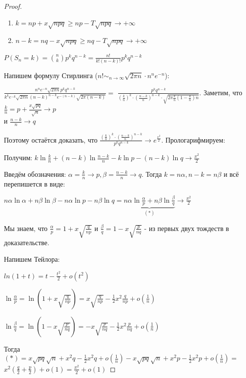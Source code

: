 \begin{proof}
    \hfill \smallbreak
    \begin{enumerate}
        \item {
            $k = np + x\sqrt{npq} \geqslant np - T\sqrt{npq} \rightarrow +\infty$
        }
        \item {
            $n - k = nq - x\sqrt{npq} \geqslant nq - T\sqrt{npq} \rightarrow +\infty$
        }
    \end{enumerate}

    $P(S_n = k) = \binom{n}{k} p^k q^{n - k} = \frac{n!}{k!(n - k)!}p^k q^{n - k}$
    
    Напишем формулу Стирлинга ($n! \sim_{n \to \infty} \sqrt{2 \pi n} \cdot n^n e^{-n}$):

    $\frac{n^n e^{-n} \sqrt{2\pi n}p^kq^{n-k}}{k^ke^{-k}\sqrt{2\pi n} (n-k)^{n - k} e^{-(n - k)} \sqrt{2 \pi (n - k)}} =$
    $\frac{p^k q^{n - k}}{(\frac{k}{n})^k \cdot (\frac{n - k}{n})^{n - k} \cdot \sqrt{2 \pi \frac{k}{n} (1 - \frac{k}{n})n}}$.
    Заметим, что $\frac{k}{n} = p + \frac{x\sqrt{pq}}{\sqrt{n}} \rightarrow p$ \\ и $\frac{n - k}{n} \rightarrow q$

    Поэтому остаётся доказать, что $\frac{(\frac{k}{n})^k \cdot (\frac{n - k}{n})^{n - k}}{p^k q^{n - k}} \rightarrow e^{\frac{x^2}{2}}$. Прологарифмируем:

    Получим: $k \ln \frac{k}{n} + (n - k) \ln \frac{n - k}{n} - k \ln p - (n - k)\ln q \rightarrow \frac{x^2}{2}$

    Введём обозначения: $\alpha = \frac{k}{n} \rightarrow p, \beta = \frac{n - k}{n} \rightarrow q$. Тогда $k = n\alpha, n - k = n\beta$ и всё перепишется в виде:

    $n \alpha \ln \alpha + n \beta \ln \beta - n\alpha \ln p - n\beta \ln q = \underbrace{n\alpha \ln \frac{\alpha}{p} + n \beta \ln \frac{\beta}{q}}_{(*)} \rightarrow \frac{x^2}{2}$

    Мы знаем, что $\frac{\alpha}{p} = 1 + x\sqrt{\frac{q}{np}}$ и $\frac{\beta}{q} = 1 - x\sqrt{\frac{p}{nq}}$ - из первых двух тождеств в доказательстве.

    Напишем Тейлора:

    $ln(1+t) = t - \frac{t^2}{2} + o(t^2)$

    $\ln \frac{\alpha}{p} = \ln (1 + x\sqrt{\frac{q}{np}}) = x\sqrt{\frac{q}{np}} - \frac{1}{2}x^2\frac{q}{np} + o(\frac{1}{n}) $

    $\ln \frac{\beta}{q} = \ln (1 - x\sqrt{\frac{p}{nq}}) = -x\sqrt{\frac{p}{nq}} - \frac{1}{2}x^2 \frac{p}{nq} + o(\frac{1}{n})$

    Тогда $(*) = x\sqrt{pq}\sqrt{n} + x^2q - \frac{1}{2}x^2q + o(\frac{1}{n}) - x\sqrt{pq}\sqrt{n} + x^2p - \frac{1}{2}x^2p + o(\frac{1}{n}) = $
    $x^2 (\frac{q}{2} + \frac{p}{2}) + o(1) = \frac{x^2}{2} + o(1)$
\end{proof}

